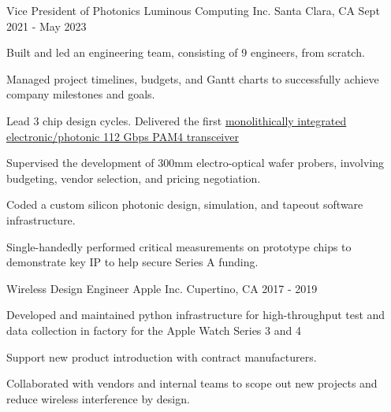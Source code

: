 \begin{cventries}
  \cventry
    {Vice President of Photonics} %
    {Luminous Computing Inc.}
    {Santa Clara, CA} %
    {Sept 2021 - May 2023} %
    {
      \begin{cvitems} %
        \item {Built and led an engineering team, consisting of 9 engineers, from scratch.}
        \item {Managed project timelines, budgets, and Gantt charts to successfully achieve company milestones and goals.}
        \item {Lead 3 chip design cycles. Delivered the first \href{https://preprints.opticaopen.org/articles/preprint/Monolithically_integrated_112_Gbps_PAM4_optical_transmitter_and_receiver_in_a_45nm_CMOS-silicon_photonics_process/22814837}{monolithically integrated electronic/photonic 112 Gbps PAM4 transceiver}}
        \item {Supervised the development of 300mm electro-optical wafer probers, involving budgeting, vendor selection, and pricing negotiation.}
        \item {Coded a custom silicon photonic design, simulation, and tapeout software infrastructure.}
        \item {Single-handedly performed critical measurements on prototype chips to demonstrate key IP to help secure Series A funding.}
      \end{cvitems}
    }
    
  \cventry
    {Wireless Design Engineer} %
    {Apple Inc. }
    {Cupertino, CA} %
    {2017 - 2019} %
    {
      \begin{cvitems} %
        \item {Developed and maintained python infrastructure for high-throughput test and data collection in factory for the Apple Watch Series 3 and 4}
        \item {Support new product introduction with contract manufacturers.}
        \item {Collaborated with vendors and internal teams to scope out new projects and reduce wireless interference by design.}
      \end{cvitems}
    }
    

\end{cventries}
